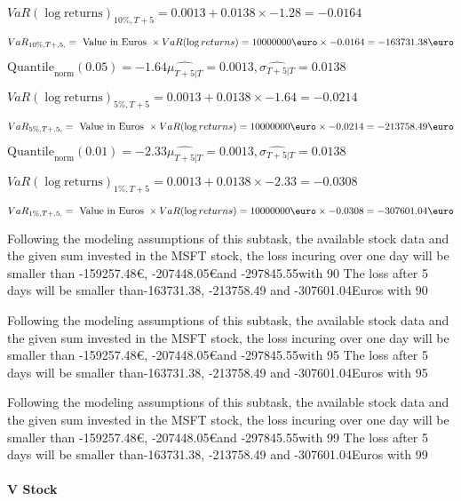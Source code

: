 $VaR(\log \text{returns})_{10\%, T + 5} = 0.0013 + 0.0138\times-1.28 = -0.0164$

$VaR_{10\%, T + ,5,} = \text{ Value in Euros } \times VaR(\log returns) = 10 000 000 \text{\euro} \times-0.0164 = -163731.38 \text{\euro}$


$\text{Quantile}_\text{norm}(0.05) = -1.64$$\hat{\mu_{T+5|T}} = 0.0013, \hat{\sigma_{T+5|T}} = 0.0138$

$VaR(\log \text{returns})_{5\%, T + 5} = 0.0013 + 0.0138\times-1.64 = -0.0214$

$VaR_{5\%, T + ,5,} = \text{ Value in Euros } \times VaR(\log returns) = 10 000 000 \text{\euro} \times-0.0214 = -213758.49 \text{\euro}$


$\text{Quantile}_\text{norm}(0.01) = -2.33$$\hat{\mu_{T+5|T}} = 0.0013, \hat{\sigma_{T+5|T}} = 0.0138$

$VaR(\log \text{returns})_{1\%, T + 5} = 0.0013 + 0.0138\times-2.33 = -0.0308$

$VaR_{1\%, T + ,5,} = \text{ Value in Euros } \times VaR(\log returns) = 10 000 000 \text{\euro} \times-0.0308 = -307601.04 \text{\euro}$


Following the modeling assumptions of this subtask, the available stock data and the given sum invested in the MSFT stock, the loss incuring over one day will be smaller than -159257.48\euro, -207448.05\euro and -297845.55\euroEuros with 90%
The loss after 5 days will be smaller than-163731.38, -213758.49 and -307601.04Euros with 90%
 

Following the modeling assumptions of this subtask, the available stock data and the given sum invested in the MSFT stock, the loss incuring over one day will be smaller than -159257.48\euro, -207448.05\euro and -297845.55\euroEuros with 95%
The loss after 5 days will be smaller than-163731.38, -213758.49 and -307601.04Euros with 95%
 

Following the modeling assumptions of this subtask, the available stock data and the given sum invested in the MSFT stock, the loss incuring over one day will be smaller than -159257.48\euro, -207448.05\euro and -297845.55\euroEuros with 99%
The loss after 5 days will be smaller than-163731.38, -213758.49 and -307601.04Euros with 99%

\paragraph{V Stock}


